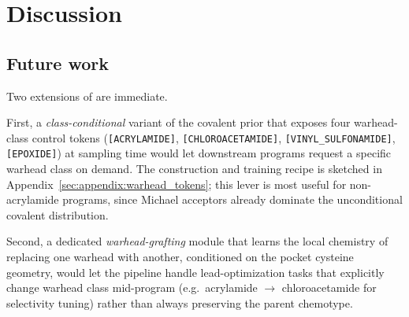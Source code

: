 \section{Discussion}\label{sec:discussion}


\subsection{Future work}\label{sec:discussion:future}

Two extensions of \covagen{} are immediate.

First, a \emph{class-conditional} variant of the covalent prior that exposes four warhead-class control tokens (\texttt{[ACRYLAMIDE]}, \texttt{[CHLOROACETAMIDE]}, \texttt{[VINYL\_SULFONAMIDE]}, \texttt{[EPOXIDE]}) at sampling time would let downstream programs request a specific warhead class on demand. The construction and training recipe is sketched in Appendix~\ref{sec:appendix:warhead_tokens}; this lever is most useful for non-acrylamide programs, since Michael acceptors already dominate the unconditional covalent distribution.

Second, a dedicated \emph{warhead-grafting} module that learns the local chemistry of replacing one warhead with another, conditioned on the pocket cysteine geometry, would let the pipeline handle lead-optimization tasks that explicitly change warhead class mid-program (e.g.\ acrylamide $\to$ chloroacetamide for selectivity tuning) rather than always preserving the parent chemotype.
